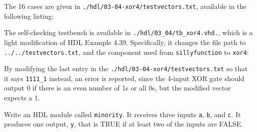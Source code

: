 \documentclass[12pt]{article}
\newenvironment{ex}[2][Exercise]{\begin{trivlist}
		\item[\hskip \labelsep {\bfseries #1}\hskip \labelsep {\bfseries #2.}]}{\end{trivlist}}
\newenvironment{sol}[1][Solution]{\begin{trivlist}
		\item[\hskip \labelsep {\bfseries #1:}]}{\end{trivlist}}
\begin{document}
\begin{sol}
	 The 16 cases are given in \texttt{./hdl/03-04-xor4/testvectors.txt}, available in the
	 following listing:
	
	The self-checking testbench is available in \texttt{./hdl/03\_04/tb\_xor4.vhd.},
	which is a light modification of HDL Example 4.39. Specifically, it changes
	the file path to \texttt{../../testvectors.txt}, and the component used from
	\texttt{sillyfunction} to \texttt{xor4}:
	
	By modifying the last entry in the \texttt{./hdl/03-04-xor4/testvectors.txt}
	so that it says \texttt{1111\_1} instead, an error is reported, since
	the 4-input XOR gate should output 0 if there is an even number of 1s
	or all 0s, but the modified vector expects a 1.
\end{sol}

\begin{ex}{4.5}
	Write an HDL module called \texttt{minority}. It receives three inputs \texttt{a}, \texttt{b}, and
	\texttt{c}. It produces one output, \texttt{y}, that is TRUE if at least two of the inputs
	are FALSE.
\end{ex}
\end{document}
